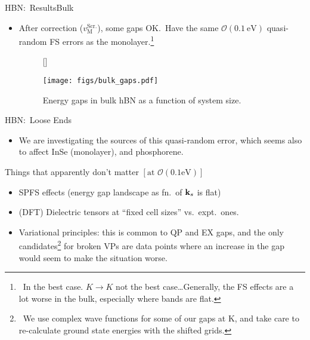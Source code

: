 \documentclass[12pt, pdf, hyperref={draft}, usenames, dvipsnames,
aspectratio=169]{beamer}
\begin{document}
\begin{frame}{HBN:\ Results}{Bulk}
\begin{itemize}
  \item After correction ($v^{\text{Scr.}}_{\text{M}}$), some gaps OK.\
  Have the same $\mathcal{O}(0.1\ \text{eV})$ quasi-random FS errors as
  the monolayer.\footnote{\ In the best case. $K \rightarrow K$ not the best
  case\ldots Generally, the FS effects are a lot worse in the bulk, especially
  where bands are flat.}
\begin{figure}[H]
  \floatbox[{\capbeside\thisfloatsetup{capbesideposition={right, center},
  capbesidewidth=0.3\textwidth}}]{figure}[\FBwidth]
  {\caption{Energy gaps in bulk hBN as a function of system
  size.}\label{fig:bulk_gaps}}
  {\texttt{[image: figs/bulk\_gaps.pdf]}}
\end{figure}
\end{itemize}
\end{frame}


\begin{frame}{HBN:\ Loose Ends}
\begin{itemize}
  \item We are investigating the sources of this quasi-random error, which
  seems also to affect InSe (monolayer), and phosphorene.
\end{itemize}
\begin{block}{Things that apparently don't matter $\left[\text{at }
\mathcal{O}(0.1\text{eV}) \right]$}
\begin{itemize}
  \item SPFS effects (energy gap landscape as fn.\ of ${\bf k}_s$ is flat)
  \item (DFT) Dielectric tensors at ``fixed cell sizes'' vs.\ expt.\ ones.
  \item Variational principles: this is common to QP and EX gaps, and the only
  candidates\footnote{\ We use complex wave functions for some of our gaps at
  K, and take care to re-calculate ground state energies with the shifted
  grids.} for broken VPs are data points where an increase in the gap would
  seem to make the situation worse.
  \end{itemize}
\end{block}
\end{frame}
\end{document}
